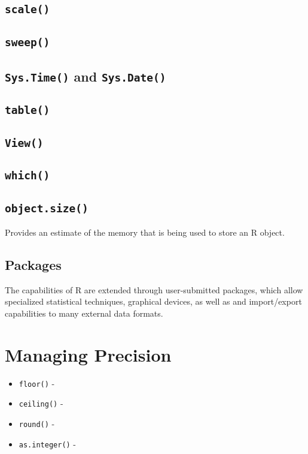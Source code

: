 \documentclass[a4paper,12pt]{article}
\begin{document}
\subsection{\texttt{scale()}}
\subsection{\texttt{sweep()}}
\subsection{\texttt{Sys.Time()} and \texttt{Sys.Date()} }
\subsection{\texttt{table()}}
\subsection{\texttt{View()}}
\subsection{\texttt{which()}}

\subsection{\texttt{object.size()}}
Provides an estimate of the memory that is being used to store an R object.
\newpage


\subsection{Packages}
The capabilities of R are extended through user-submitted packages, which allow specialized statistical techniques, graphical devices, as well as and
import/export capabilities to many external data formats.

\section{Managing Precision}
\begin{itemize}
	\item \texttt{floor()} - 
	\item \texttt{ceiling()} - 
	\item \texttt{round()} - 
	\item \texttt{as.integer()} -
\end{itemize}
\end{document}
